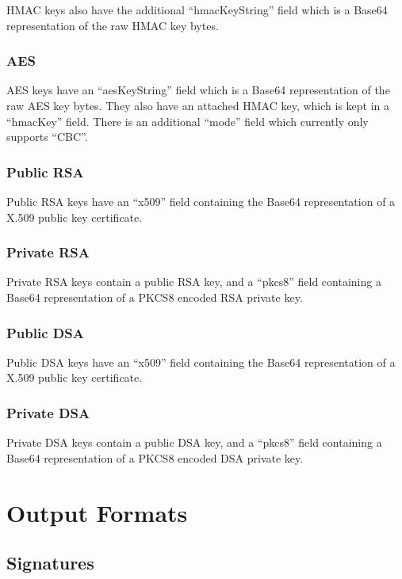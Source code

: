 \documentclass{llncs}
\begin{document}
HMAC keys also have the additional ``hmacKeyString'' field which is a Base64
representation of the raw HMAC key bytes.

\subsubsection{AES}

AES keys have an ``aesKeyString'' field which is a Base64 representation of the
raw AES key bytes. They also have an attached HMAC key, which is kept in a
``hmacKey'' field. There is an additional ``mode'' field which currently only
supports ``CBC''.

\subsubsection{Public RSA}

Public RSA keys have an ``x509'' field containing the Base64 representation of
a X.509 public key certificate. 

\subsubsection{Private RSA}

Private RSA keys contain a public RSA key, and a ``pkcs8'' field containing a
Base64 representation of a PKCS8 encoded RSA private key. 

\subsubsection{Public DSA}

Public DSA keys have an ``x509'' field containing the Base64 representation of
a X.509 public key certificate. 

\subsubsection{Private DSA}

Private DSA keys contain a public DSA key, and a ``pkcs8'' field containing a
Base64 representation of a PKCS8 encoded DSA private key. 

\section{Output Formats}

\subsection{Signatures}\label{signatures}
\end{document}
